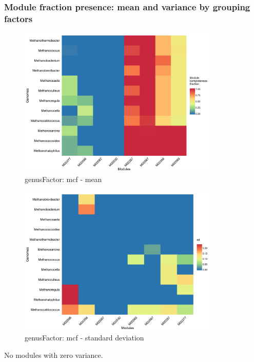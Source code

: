 \documentclass{article}
\begin{document}
\subsubsection*{Module fraction presence: mean and variance by grouping factors}
\begin{figure}\centering
\includegraphics[width=0.85\textwidth]{module_mean_genusFactor.png}
\caption{genusFactor: mcf - mean}\label{fig:module_mean_genusFactor.png}\end{figure}
\begin{figure}\centering
\includegraphics[width=0.85\textwidth]{module_sd_genusFactor.png}
\caption{genusFactor: mcf - standard deviation}\label{fig:module_sd_genusFactor.png}\end{figure}
No modules with zero variance.\\
\FloatBarrier
\end{document}

